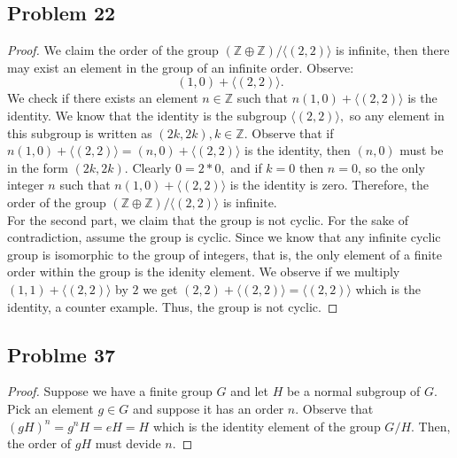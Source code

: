 \documentclass[a4paper,12pt]{article}
\begin{document}
\subsection*{Problem 22}
\begin{proof}
  We claim the order of the group $(\mathbb{Z} \oplus \mathbb{Z})/\langle (2,2) \rangle$ is infinite, then there may exist an element in the group of an infinite order. Observe:
  \[(1,0)+\langle (2,2) \rangle.\]
  We check if there exists an element $n \in \mathbb{Z}$ such that $n(1,0)+\langle (2,2) \rangle$ is the identity.
  We know that the identity is the subgroup $\langle (2,2) \rangle,$ so any element in this subgroup is written as $(2k,2k), k \in \mathbb{Z}.$
  Observe that if $n(1,0)+\langle (2,2)\rangle=(n,0)+\langle (2,2) \rangle$ is the identity, then $(n,0)$ must be in the form $(2k,2k).$ Clearly $0=2 * 0,$ and if $k=0$ then $n=0$, so the only integer $n$ such that $n(1,0)+\langle (2,2) \rangle$ is the identity is zero. Therefore, the order of the group $(\mathbb{Z} \oplus \mathbb{Z})/\langle (2,2) \rangle$ is infinite.
 \\ For the second part, we claim that the group is not cyclic. For the sake of contradiction, assume the group is cyclic. Since we know that any infinite cyclic group is isomorphic to the group of integers, that is, the only element of a finite order within the group is the idenity element. We observe if we multiply $(1,1) +\langle (2,2) \rangle$ by $2$ we get $(2,2)+\langle (2,2) \rangle=\langle (2,2) \rangle$ which is the identity, a counter example. Thus, the group is not cyclic.
\end{proof}
\subsection*{Problme 37}
\begin{proof}
  Suppose we have a finite group $G$ and let $H$ be a normal subgroup of $G.$ Pick an element $g \in G$ and suppose it has an order $n.$ Observe that $(gH)^n=g^nH=eH=H$ which is the identity element of the group $G/H.$ Then, the order of $gH$ must devide $n.$
\end{proof}
\end{document}
